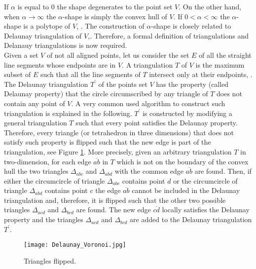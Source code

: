 If $\alpha$ is equal to $0$ the shape degenerates to the point set $V$. On the other hand, when $\alpha\rightarrow\infty$ the $\alpha$-shape is simply the convex hull of $V$. If $0<\alpha<\infty$ the $\alpha$-shape is a polytope of $V$, \cite{edelsbrunner1994three}. The construction of $\alpha$-shape is closely related to Delaunay triangulation of $V$,\cite{mucke1993shapes}. Therefore, a formal definition of triangulations and Delanauy triangulations is now required. \\ \indent
Given a set $V$ of not all aligned points, let us consider the set $E$ of all the straight line segments whose endpoints are in $V$. 
A triangulation $T$ of $V$ is the maximum subset of $E$ such that all the line segments of $T$ intersect only at their endpoints, \cite{lloyd1977triangulations}. \\ \indent 
The Delaunay triangulation $T^{\prime}$ of the points set $V$ has the property (called Delaunay property) that the circle circumscribed by any triangle of $T$ does not contain any point of $V$. A very common used algorithm to construct such triangulation is explained in the following. 
$T^\prime$ is constructed by modifying a general triangulation $T$ such that every point satisfies the Delaunay property. 
Therefore, every triangle (or tetrahedron in three dimensions) that does not satisfy such property is flipped such that the new edge is part of the triangulation, see Figure \ref{fig:Delaunay}. 
More precisely, given an arbitrary triangulation $T$ in two-dimension, for each edge $\overline{ab}$ in $T$ which is not on the boundary of the convex hull the two triangles 
$\Delta_{abc}$ and $\Delta_{abd}$ with the common edge $\overline{ab}$ are found. Then, if either the circumcircle of triangle $\Delta_{abc}$ contains point $d$ or the circumcircle of triangle $\Delta_{abd}$ contains point $c$ the edge $\overline{ab}$ cannot be included in the Delaunay triangulation and, therefore, it is flipped such that the other two possible triangles $\Delta_{acd}$ and $\Delta_{bcd}$ are found. The new edge $\overline{cd}$ locally satisfies the Delaunay property and the triangles $\Delta_{acd}$ and  $\Delta_{bcd}$ are added to the Delaunay triangulation $T^\prime$.  
\begin{figure}[h]\label{fig:Delaunay}
\begin{center}
\texttt{[image: Delaunay\_Voronoi.jpg]}
\label{fig:shape}
\caption{Triangles flipped.}
\label{fig:Delaunay}
\end{center}
\end{figure}
